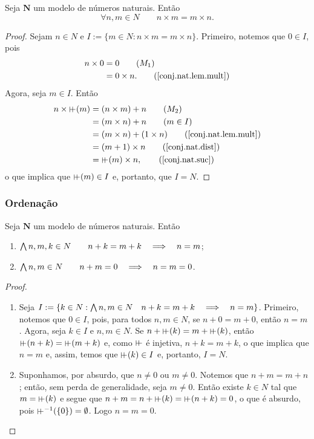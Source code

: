 \begin{theorem}
	Seja $\bm N$ um modelo de números naturais. Então
	\begin{equation*}
	\forall n,m \in N \qquad n \times m = m \times n.
	\end{equation*}
\end{theorem}
\begin{proof}
	Sejam $n \in N$ e $I := \{m \in N:n \times m=m \times n\}$. Primeiro, notemos que $0 \in I$, pois
	\begin{align*}
	n \times 0 &= 0 													\tag{$M_1$} \\
		&= 0 \times n.													\tag{\ref{conj.nat.lem.mult}}
	\end{align*}
Agora, seja $m \in I$. Então
	\begin{align*}
	n \times \suce(m) &= (n \times m) + n							\tag{$M_2$} \\
		&= (m \times n) + n											\tag{$m \in I$} \\
		&= (m \times n) + (1 \times n)							\tag{\ref{conj.nat.lem.mult}} \\
		&= (m +1) \times n											\tag{\ref{conj.nat.dist}} \\
		&= \suce(m) \times n,												\tag{\ref{conj.nat.suc}}
	\end{align*}
o que implica que $\suce(m) \in I$ e, portanto, que $I=N$.
\end{proof}

\subsubsection{Ordenação}

\begin{lemma}
	Seja $\bm N$ um modelo de números naturais. Então
	\begin{enumerate}
	\item $\bigwedge\nolimits n,m,k \in N \qquad n+k=m+k \quad \Longrightarrow \quad n=m$;
	\item $\bigwedge\nolimits n,m \in N \qquad n+m = 0 \quad \Longrightarrow \quad n=m=0$.
	\end{enumerate}
\end{lemma}
\begin{proof}
	\begin{enumerate}
	\item Seja $I := \{k \in N: \bigwedge\nolimits n,m \in N \quad n+k=m+k \quad \Longrightarrow \quad n=m\}$. Primeiro, notemos que $0 \in I$, pois, para todos $n,m \in N$, se $n+0=m+0$, então $n=m$. Agora, seja $k \in I$ e $n,m \in N$. Se $n+\suce(k)=m+\suce(k)$, então $\suce(n+k)=\suce(m+k)$ e, como $\suce$ é injetiva, $n+k=m+k$, o que implica que $n=m$ e, assim, temos que $\suce(k) \in I$ e, portanto, $I=N$.
	
	\item Suponhamos, por absurdo, que $n \neq 0$ ou $m \neq 0$. Notemos que $n+m=m+n$; então, sem perda de generalidade, seja $m \neq 0$. Então existe $k \in N$ tal que $m=\suce(k)$ e segue que $n+m=n+\suce(k)=\suce(n+k)=0$, o que é absurdo, pois $\suce\inv(\{0\})=\emptyset$. Logo $n=m=0$.
	\end{enumerate}
\end{proof}

